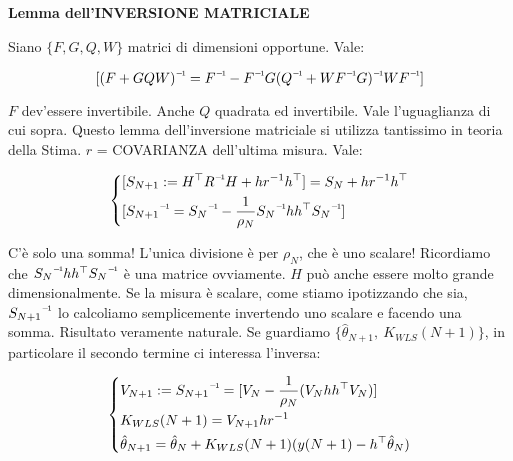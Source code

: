 \begin{lemma}{\textbf{Lemma dell'INVERSIONE MATRICIALE}} 

Siano $\{F,G,Q,W\}$ matrici di dimensioni opportune. Vale:

\[
	[\inv{(F+GQW)} = \inv{F} - \inv{F}G\inv{(\inv{Q}+W\inv{F}G)}W\inv{F}]
\]

\end{lemma}

$F$ dev'essere invertibile. Anche $Q$ quadrata ed invertibile. Vale l'uguaglianza di cui sopra. Questo lemma dell'inversione matriciale si utilizza tantissimo in teoria della Stima. $r$ = COVARIANZA dell'ultima misura. Vale:

\[
	\left\{
	\begin{aligned}
	&[S_{N+1} := H^\top\inv{R}H + hr^{-1}h^\top] = S_N + hr^{-1}h^\top\\
	&[\inv{S_{N+1}} = \inv{S_N} - \frac{1}{\rho_N} \inv{S_N}hh^\top \inv{S_N}]
	\end{aligned}
	\right.
\]

C'è solo una somma! L'unica divisione è per $\rho_N$, che è uno scalare! Ricordiamo che $\inv{S_N}hh^\top \inv{S_N}$ è una matrice ovviamente. $H$ può anche essere molto grande dimensionalmente. Se la misura è scalare, come stiamo ipotizzando che sia, $\inv{S_{N+1}}$ lo calcoliamo semplicemente invertendo uno scalare e facendo una somma. Risultato veramente naturale. Se guardiamo $\{\hat{\theta}_{N+1},\ K_{WLS}(N+1)\}$, in particolare il secondo termine ci interessa l'inversa:

\[
	\left\{
	\begin{aligned}
	&V_{N+1} := \inv{S_{N+1}} = [V_N - \frac{1}{\rho_N}(V_Nhh^\top V_N)]\\
	&K_{WLS}(N+1) = V_{N+1}hr^{-1}\\
	&\hat{\theta}_{N+1} = \hat{\theta}_N + K_{WLS}(N+1)(y(N+1)-h^\top\hat{\theta}_N)
	\end{aligned}
	\right.
\]

